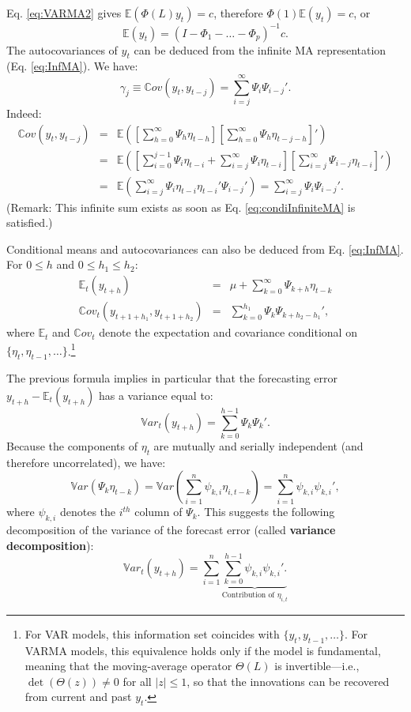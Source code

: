 \documentclass[
  11pt,
]{book}
\theoremstyle{definition}
\theoremstyle{definition}
\theoremstyle{definition}
\theoremstyle{definition}
\theoremstyle{remark}
\begin{document}
Eq. \eqref{eq:VARMA2} gives \(\mathbb{E}(\Phi(L)y_t)=c\), therefore \(\Phi(1)\mathbb{E}(y_t)=c\), or
\[
\mathbb{E}(y_t) = (I - \Phi_1 - \dots - \Phi_p)^{-1}c.
\]
The autocovariances of \(y_t\) can be deduced from the infinite MA representation (Eq. \eqref{eq:InfMA}). We have:
\[
\gamma_j \equiv \mathbb{C}ov(y_t,y_{t-j}) = \sum_{i=j}^\infty \Psi_i \Psi_{i-j}'.
\]
Indeed:
\begin{eqnarray*}
\mathbb{C}ov(y_t,y_{t-j}) &=& \mathbb{E}\left(\left[\sum_{h=0}^\infty \Psi_{h} \eta_{t-h}\right]\left[\sum_{h=0}^\infty \Psi_{h} \eta_{t-j-h}\right]'\right)\\
&=& \mathbb{E}\left(\left[\sum_{i=0}^{j-1} \Psi_{i} \eta_{t-i}+\sum_{i=j}^\infty \Psi_{i} \eta_{t-i}\right]\left[\sum_{i=j}^\infty \Psi_{i-j} \eta_{t-i}\right]'\right)\\
&=&\mathbb{E}\left(\sum_{i=j}^\infty \Psi_{i} \eta_{t-i}\eta_{t-i}'\Psi_{i-j}'\right)= \sum_{i=j}^\infty \Psi_i \Psi_{i-j}'.
\end{eqnarray*}
(Remark: This infinite sum exists as soon as Eq. \eqref{eq:condiInfiniteMA} is satisfied.)

Conditional means and autocovariances can also be deduced from Eq. \eqref{eq:InfMA}. For \(0 \le h\) and \(0 \le h_1 \le h_2\):
\begin{eqnarray*}
\mathbb{E}_t(y_{t+h}) &=& \mu + \sum_{k=0}^\infty \Psi_{k+h} \eta_{t-k} \\
\mathbb{C}ov_t(y_{t+1+h_1},y_{t+1+h_2}) &=& \sum_{k=0}^{h_1} \Psi_{k}\Psi_{k+h_2-h_1}',
\end{eqnarray*}
where \(\mathbb{E}_t\) and \(\mathbb{C}ov_t\) denote the expectation and covariance conditional on \(\{\eta_t,\eta_{t-1},\dots\}\).\footnote{For VAR models, this information set coincides with \(\{y_t,y_{t-1},\ldots\}\). For VARMA models, this equivalence holds only if the model is fundamental, meaning that the moving-average operator \(\Theta(L)\) is invertible---i.e., \(\det(\Theta(z))\neq0\) for all \(|z|\le1\), so that the innovations can be recovered from current and past \(y_t\).}

The previous formula implies in particular that the forecasting error \(y_{t+h} - \mathbb{E}_t(y_{t+h})\) has a variance equal to:
\[
\boxed{\mathbb{V}ar_t(y_{t+h}) = \sum_{k=0}^{h-1} \Psi_{k}\Psi_{k}'.}
\]
Because the components of \(\eta_t\) are mutually and serially independent (and therefore uncorrelated), we have:
\[
\mathbb{V}ar(\Psi_k \eta_{t-k}) = \mathbb{V}ar\left(\sum_{i=1}^n \psi_{k,i} \eta_{i,t-k}\right)  = \sum_{i=1}^n \psi_{k,i}\psi_{k,i}',
\]
where \(\psi_{k,i}\) denotes the \(i^{th}\) column of \(\Psi_k\). This suggests the following decomposition of the variance of the forecast error (called \textbf{variance decomposition}):
\[
\mathbb{V}ar_t(y_{t+h}) = \sum_{i=1}^n \underbrace{\sum_{k=0}^{h-1}\psi_{k,i}\psi_{k,i}'.}_{\mbox{Contribution of $\eta_{i,t}$}}
\]
\end{document}

